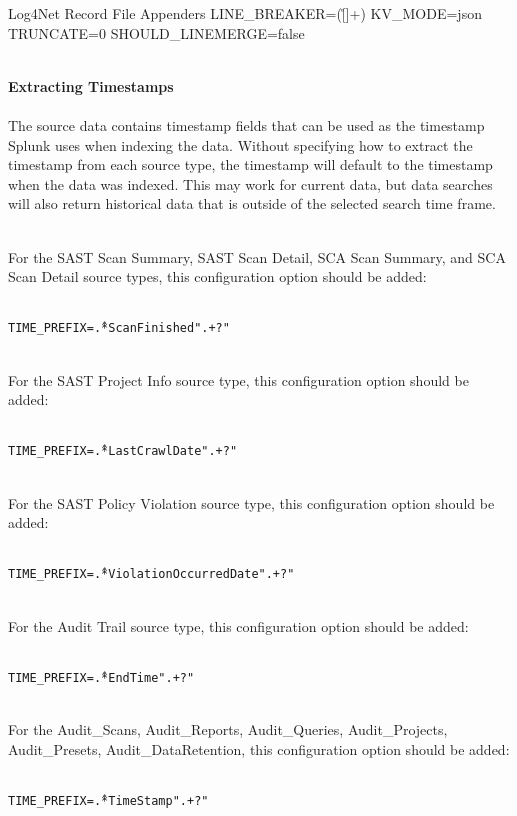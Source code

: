 \begin{code}{Log4Net Record File Appenders}{\label{lst:sourcetypes}}{}
LINE_BREAKER=([\r\n]+)
KV_MODE=json
TRUNCATE=0
SHOULD_LINEMERGE=false
\end{code}

\noindent\\\textbf{Extracting Timestamps}\\

\noindent\\The source data contains timestamp fields that can be used as the timestamp Splunk uses when indexing the data.  Without specifying how to extract the
timestamp from each source type, the timestamp will default to the timestamp when the data was indexed.  This may work for current data, but data searches 
will also return historical data that is outside of the selected search time frame.

\noindent\\For the SAST Scan Summary, SAST Scan Detail, SCA Scan Summary, and SCA Scan Detail source types, this configuration option should be added:

\noindent\\\texttt{TIME\_PREFIX=\^.*ScanFinished".+?"}

\noindent\\For the SAST Project Info source type, this configuration option should be added:

\noindent\\\texttt{TIME\_PREFIX=\^.*LastCrawlDate".+?"}

\noindent\\For the SAST Policy Violation source type, this configuration option should be added:

\noindent\\\texttt{TIME\_PREFIX=\^.*ViolationOccurredDate".+?"}

\noindent\\For the Audit Trail source type, this configuration option should be added:

\noindent\\\texttt{TIME\_PREFIX=\^.*EndTime".+?"}

\noindent\\For the Audit\_Scans, Audit\_Reports, Audit\_Queries, Audit\_Projects, Audit\_Presets, Audit\_DataRetention, this configuration option should be added:

\noindent\\\texttt{TIME\_PREFIX=\^.*TimeStamp".+?"}

